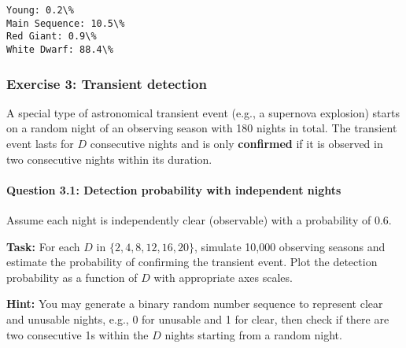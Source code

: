\documentclass[11pt]{article}
\begin{document}
    \begin{Verbatim}[commandchars=\\\{\}]
Young: 0.2\%
Main Sequence: 10.5\%
Red Giant: 0.9\%
White Dwarf: 88.4\%
    \end{Verbatim}

    \subsubsection{Exercise 3: Transient
detection}\label{exercise-3-transient-detection}

A special type of astronomical transient event (e.g., a supernova
explosion) starts on a random night of an observing season with 180
nights in total. The transient event lasts for \(D\) consecutive nights
and is only \textbf{confirmed} if it is observed in two consecutive
nights within its duration.

\paragraph{Question 3.1: Detection probability with independent
nights}\label{question-3.1-detection-probability-with-independent-nights}

Assume each night is independently clear (observable) with a probability
of 0.6.

\textbf{Task:} For each \(D\) in \(\{2,4,8,12,16,20\}\), simulate 10,000
observing seasons and estimate the probability of confirming the
transient event. Plot the detection probability as a function of \(D\)
with appropriate axes scales.

\textbf{Hint:} You may generate a binary random number sequence to
represent clear and unusable nights, e.g., 0 for unusable and 1 for
clear, then check if there are two consecutive 1s within the \(D\)
nights starting from a random night.
\end{document}
